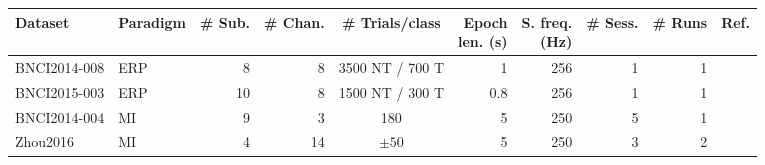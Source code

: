 \begin{tabularx}{\linewidth}{@{}Xlrrcrrrrr@{}}
  \toprule
  Dataset    &   Paradigm & \# Sub. & \# Chan.  & \# Trials/class & \makecell{Epoch \\ len. (s)}  & \makecell{S. freq.\\(Hz)} & \# Sess.  & \# Runs & Ref. \\
  \midrule
  BNCI2014-008  & ERP & 8       & 8         & 3500 NT / 700 T & 1                              & 256                         & 1             & 1      & \cite{Riccio2013}  \\
  BNCI2015-003  & ERP & 10      & 8         & 1500 NT / 300 T & 0.8                           & 256                         & 1             & 1       & \cite{Guger2009} \\
  \midrule
  BNCI2014-004  & MI  & 9       & 3         & 180             & 5                             & 250                         & 5             & 1       & \cite{Leeb2007}\\
  Zhou2016      & MI  & 4       & 14        & $\pm50$         & 5                             & 250                         & 3             & 2       & \cite{Zhou2016} \\
  \bottomrule
\end{tabularx}
